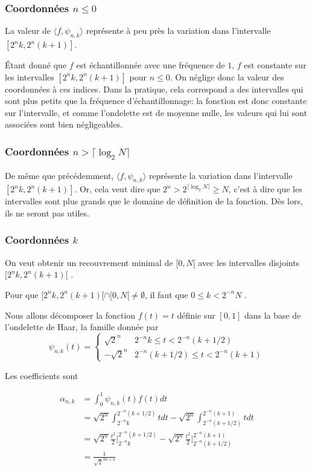 \subsubsection{Coordonnées $n\le 0$}

La valeur de $\langle f,\psi_{n,k}\rangle$ représente à peu près la variation dans l'intervalle $[2^{n}k,2^{n}(k+1)]$.

Étant donné que $f$ est échantillonnée avec une fréquence de $1$, $f$ est constante sur les intervalles $[2^{n}k,2^{n}(k+1)]$ pour $n\le 0$. On néglige donc la valeur des coordonnées à ces indices.
Dans la pratique, cela correspond a des intervalles qui sont plus petits que la fréquence d'échantillonnage: la fonction est donc constante sur l'intervalle, et comme l'ondelette est de moyenne nulle, les valeurs qui lui sont associées sont bien négligeables. 


\subsubsection{Coordonnées $n > \lceil\log_2 N\rceil$}

De même que précédemment, $\langle f,\psi_{n,k}\rangle$ représente la variation dans l'intervalle $[2^{n}k,2^{n}(k+1)]$. Or, cela veut dire que $2^n > 2^{\lceil\log_2 N\rceil}  \geqslant N$,  c'est à dire que les intervalles sont plus grands que le domaine de définition de la fonction. Dès lors, ils ne seront pas utiles.  



\subsubsection{Coordonnées $k$}

On veut obtenir un recouvrement minimal de $[0,N[$ avec les intervalles disjoints $[2^{n}k,2^{n}(k+1)[$ .

Pour que $[2^{n}k,2^{n}(k+1)[\cap[0,N[\neq\emptyset$, il faut que $0\le k< 2^{-n}N$ .

\begin{myexmpl}
	Nous allons décomposer la fonction $f(t)=t$ définie sur $[0, 1]$ dans la base de l'ondelette de Haar, la famille donnée par
	$$\psi_{n, k}(t) = \left\{
	\begin{array}{cc}
		\sqrt{2}^n & 2^{-n}k \leqslant t < 2^{-n} (k+1/2) \\
		-\sqrt{2}^n & 2^{-n}(k+1/2) \leqslant t < 2^{-n} (k+1)
	\end{array}
	\right.$$
	
	Les coefficients sont 
	
	\begin{align*}
		\alpha_{n, k} &= \int_{0}^{1} \psi_{n, k}(t) f(t) dt \\
		&= \sqrt{2^n} \int_{2^{-n}k}^{2^{-n}(k+1/2)} t dt - \sqrt{2^n} \int_{2^{-n}(k+1/2)}^{2^{-n}(k+1)} t dt \\
		&= \sqrt{2^n} \frac{t^2}{2} \bigg \vert_{2^{-n} k}^{2^{-n}(k+1/2)} - \sqrt{2^n} \frac{t^2}{2} \bigg \vert_{2^{-n} (k+1/2)}^{2^{-n}(k+1)} \\
		&= \frac{1}{\sqrt{2}^{3n + 4}}
	\end{align*}
\end{myexmpl}


